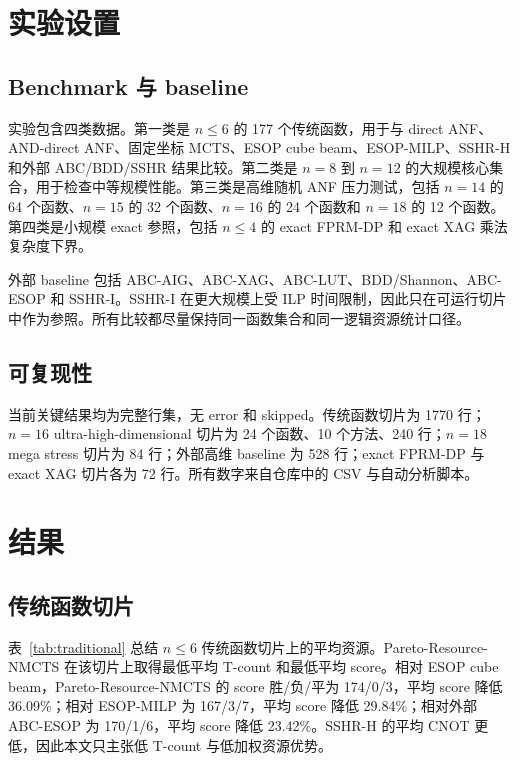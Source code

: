 \documentclass[UTF8,fontset=macnew,11pt]{ctexart}
\newcommand{\pareto}{Pareto-Resource-NMCTS}
\begin{document}
\section{实验设置}

\subsection{Benchmark 与 baseline}

实验包含四类数据。第一类是 $n\leq 6$ 的 177 个传统函数，用于与 direct ANF、AND-direct ANF、固定坐标 MCTS、ESOP cube beam、ESOP-MILP、SSHR-H 和外部 ABC/BDD/SSHR 结果比较。第二类是 $n=8$ 到 $n=12$ 的大规模核心集合，用于检查中等规模性能。第三类是高维随机 ANF 压力测试，包括 $n=14$ 的 64 个函数、$n=15$ 的 32 个函数、$n=16$ 的 24 个函数和 $n=18$ 的 12 个函数。第四类是小规模 exact 参照，包括 $n\leq 4$ 的 exact FPRM-DP 和 exact XAG 乘法复杂度下界。

外部 baseline 包括 ABC-AIG、ABC-XAG、ABC-LUT、BDD/Shannon、ABC-ESOP 和 SSHR-I。SSHR-I 在更大规模上受 ILP 时间限制，因此只在可运行切片中作为参照。所有比较都尽量保持同一函数集合和同一逻辑资源统计口径。

\subsection{可复现性}

当前关键结果均为完整行集，无 error 和 skipped。传统函数切片为 1770 行；$n=16$ ultra-high-dimensional 切片为 24 个函数、10 个方法、240 行；$n=18$ mega stress 切片为 84 行；外部高维 baseline 为 528 行；exact FPRM-DP 与 exact XAG 切片各为 72 行。所有数字来自仓库中的 CSV 与自动分析脚本。

\section{结果}

\subsection{传统函数切片}

表~\ref{tab:traditional} 总结 $n\leq 6$ 传统函数切片上的平均资源。\pareto{} 在该切片上取得最低平均 T-count 和最低平均 score。相对 ESOP cube beam，\pareto{} 的 score 胜/负/平为 174/0/3，平均 score 降低 36.09\%；相对 ESOP-MILP 为 167/3/7，平均 score 降低 29.84\%；相对外部 ABC-ESOP 为 170/1/6，平均 score 降低 23.42\%。SSHR-H 的平均 CNOT 更低，因此本文只主张低 T-count 与低加权资源优势。
\end{document}
